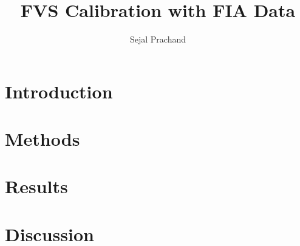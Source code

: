 \documentclass[
  letterpaper,
  DIV=11,
  numbers=noendperiod]{scrartcl}
\title{FVS Calibration with FIA Data}
\author{Sejal Prachand}
\date{}
\begin{document}
\maketitle


\section{Introduction}\label{introduction}

\section{Methods}\label{methods}

\section{Results}\label{results}

\section{Discussion}\label{discussion}
\end{document}
